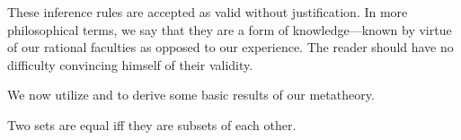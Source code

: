 \begin{rem}
    These inference rules are accepted as valid without justification.
    In more philosophical terms, we say that they are a form of  knowledge---known by virtue of our rational faculties as opposed to our experience.
    The reader should have no difficulty convincing himself of their validity.
\end{rem}

\noindent
We now utilize 
and 
to derive some basic results of our metatheory.

\begin{thm}
     \label{thm:metatheory-equality-in-terms-of-subsets}
    Two sets are equal iff they are subsets of each other.
\end{thm}


